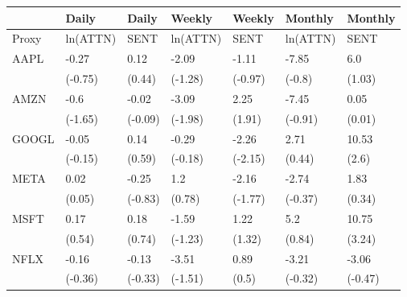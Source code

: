 \begin{tabular}{lllllll}
\toprule
{} &     Daily &    Daily &    Weekly &   Weekly &   Monthly &  Monthly \\
\midrule
Proxy &  ln(ATTN) &     SENT &  ln(ATTN) &     SENT &  ln(ATTN) &     SENT \\
AAPL  &     -0.27 &     0.12 &     -2.09 &    -1.11 &     -7.85 &      6.0 \\
      &   (-0.75) &   (0.44) &   (-1.28) &  (-0.97) &    (-0.8) &   (1.03) \\
AMZN  &      -0.6 &    -0.02 &     -3.09 &     2.25 &     -7.45 &     0.05 \\
      &   (-1.65) &  (-0.09) &   (-1.98) &   (1.91) &   (-0.91) &   (0.01) \\
GOOGL &     -0.05 &     0.14 &     -0.29 &    -2.26 &      2.71 &    10.53 \\
      &   (-0.15) &   (0.59) &   (-0.18) &  (-2.15) &    (0.44) &    (2.6) \\
META  &      0.02 &    -0.25 &       1.2 &    -2.16 &     -2.74 &     1.83 \\
      &    (0.05) &  (-0.83) &    (0.78) &  (-1.77) &   (-0.37) &   (0.34) \\
MSFT  &      0.17 &     0.18 &     -1.59 &     1.22 &       5.2 &    10.75 \\
      &    (0.54) &   (0.74) &   (-1.23) &   (1.32) &    (0.84) &   (3.24) \\
NFLX  &     -0.16 &    -0.13 &     -3.51 &     0.89 &     -3.21 &    -3.06 \\
      &   (-0.36) &  (-0.33) &   (-1.51) &    (0.5) &   (-0.32) &  (-0.47) \\
\bottomrule
\end{tabular}
